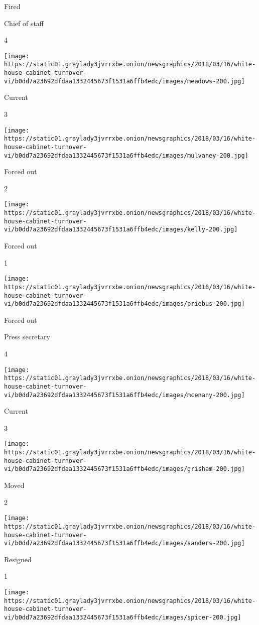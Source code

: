 Fired

Chief of staff

4

\texttt{[image: https://static01.graylady3jvrrxbe.onion/newsgraphics/2018/03/16/white-house-cabinet-turnover-vi/b0dd7a23692dfdaa1332445673f1531a6ffb4edc/images/meadows-200.jpg]}

Current

3

\texttt{[image: https://static01.graylady3jvrrxbe.onion/newsgraphics/2018/03/16/white-house-cabinet-turnover-vi/b0dd7a23692dfdaa1332445673f1531a6ffb4edc/images/mulvaney-200.jpg]}

Forced out

2

\texttt{[image: https://static01.graylady3jvrrxbe.onion/newsgraphics/2018/03/16/white-house-cabinet-turnover-vi/b0dd7a23692dfdaa1332445673f1531a6ffb4edc/images/kelly-200.jpg]}

Forced out

1

\texttt{[image: https://static01.graylady3jvrrxbe.onion/newsgraphics/2018/03/16/white-house-cabinet-turnover-vi/b0dd7a23692dfdaa1332445673f1531a6ffb4edc/images/priebus-200.jpg]}

Forced out

Press secretary

4

\texttt{[image: https://static01.graylady3jvrrxbe.onion/newsgraphics/2018/03/16/white-house-cabinet-turnover-vi/b0dd7a23692dfdaa1332445673f1531a6ffb4edc/images/mcenany-200.jpg]}

Current

3

\texttt{[image: https://static01.graylady3jvrrxbe.onion/newsgraphics/2018/03/16/white-house-cabinet-turnover-vi/b0dd7a23692dfdaa1332445673f1531a6ffb4edc/images/grisham-200.jpg]}

Moved

2

\texttt{[image: https://static01.graylady3jvrrxbe.onion/newsgraphics/2018/03/16/white-house-cabinet-turnover-vi/b0dd7a23692dfdaa1332445673f1531a6ffb4edc/images/sanders-200.jpg]}

Resigned

1

\texttt{[image: https://static01.graylady3jvrrxbe.onion/newsgraphics/2018/03/16/white-house-cabinet-turnover-vi/b0dd7a23692dfdaa1332445673f1531a6ffb4edc/images/spicer-200.jpg]}

